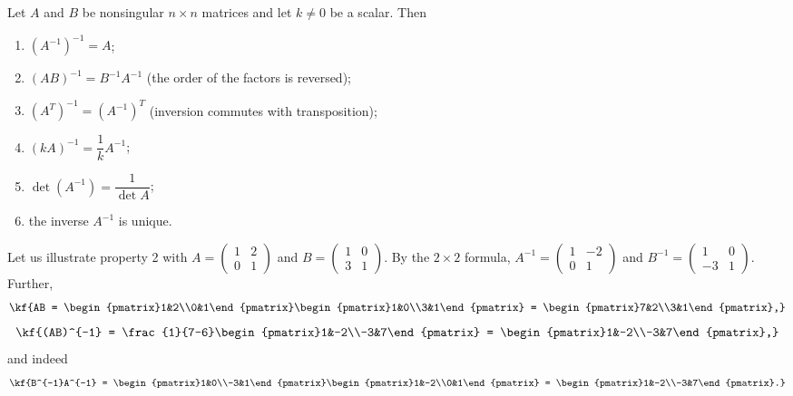 Let $A$ and $B$ be nonsingular $n\times n$ matrices and let $k\neq 0$ be a
scalar. Then
\begin{enumerate}[label=\arabic*)]
\item $(A^{-1})^{-1} = A$;
\item $(AB)^{-1} = B^{-1}A^{-1}$ \hfill (the order of the factors is reversed);
\item $(A^{T})^{-1} = (A^{-1})^{T}$ \hfill (inversion commutes with transposition);
\item $(kA)^{-1} = \dfrac{1}{k}A^{-1}$;
\item $\det(A^{-1}) = \dfrac{1}{\det A}$;
\item the inverse $A^{-1}$ is unique.
\end{enumerate}
\vspace{3pt}
\begin{misol}
Let us illustrate property 2 with $A=\begin{pmatrix}1&2\\0&1\end{pmatrix}$ and
$B=\begin{pmatrix}1&0\\3&1\end{pmatrix}$. By the $2\times 2$ formula,
$A^{-1}=\begin{pmatrix}1&-2\\0&1\end{pmatrix}$ and
$B^{-1}=\begin{pmatrix}1&0\\-3&1\end{pmatrix}$. Further,
\[\kf{AB = \begin{pmatrix}1&2\\0&1\end{pmatrix}\begin{pmatrix}1&0\\3&1\end{pmatrix}
= \begin{pmatrix}7&2\\3&1\end{pmatrix},}\]
\[\kf{(AB)^{-1} = \frac{1}{7-6}\begin{pmatrix}1&-2\\-3&7\end{pmatrix}
= \begin{pmatrix}1&-2\\-3&7\end{pmatrix},}\]
and indeed
\[\kf{B^{-1}A^{-1} = \begin{pmatrix}1&0\\-3&1\end{pmatrix}\begin{pmatrix}1&-2\\0&1\end{pmatrix}
= \begin{pmatrix}1&-2\\-3&7\end{pmatrix}.}\]
\end{misol}
